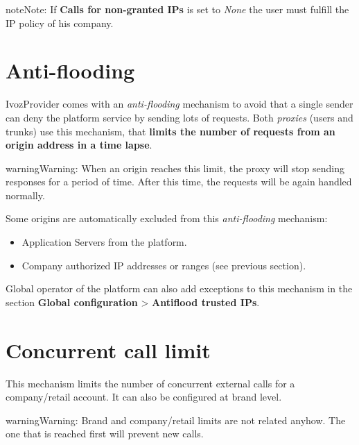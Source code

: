 \documentclass[letterpaper,10pt,english]{sphinxmanual}
\begin{document}
\begin{notice}{note}{Note:}
If \textbf{Calls for non-granted IPs} is set to \emph{None} the user must fulfill
the IP policy of his company.
\end{notice}


\section{Anti-flooding}
\label{security/index:anti-flooding}
IvozProvider comes with an \emph{anti-flooding} mechanism to avoid that a single
sender can deny the platform service by sending lots of requests. Both \emph{proxies}
(users and trunks) use this mechanism, that \textbf{limits the number of requests
from an origin address in a time lapse}.

\begin{notice}{warning}{Warning:}
When an origin reaches this limit, the proxy will stop sending
responses for a period of time. After this time, the requests will be again
handled normally.
\end{notice}

Some origins are automatically excluded from this \emph{anti-flooding} mechanism:
\begin{itemize}
\item {} 
Application Servers from the platform.

\item {} 
Company authorized IP addresses or ranges (see previous section).

\end{itemize}

Global operator of the platform can also add exceptions to this mechanism in
the section \textbf{Global configuration} \textgreater{} \textbf{Antiflood trusted IPs}.

\noindent{}


\section{Concurrent call limit}
\label{security/index:concurrent-call-limit}
This mechanism limits the number of concurrent external calls for a company/retail account. It can also be configured
at brand level.

\begin{notice}{warning}{Warning:}
Brand and company/retail limits are not related anyhow. The one that is reached first will prevent new calls.
\end{notice}
\end{document}
